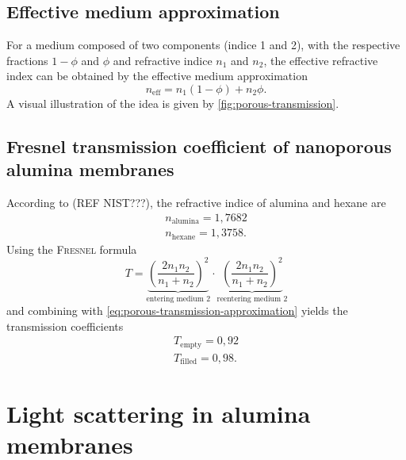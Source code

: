 \documentclass[../thesis.tex]{subfiles}
\begin{document}
      \subsection{Effective medium approximation}
      \label{subsec:effective-medium-approx}

        For a medium composed of two components (indice 1 and 2), with the respective fractions $1-\phi$ and $\phi$ and refractive indice $n_1$ and $n_2$, the effective refractive index can be obtained by the effective medium approximation
        \begin{equation}
          n_\mathrm{eff} = n_1 \left(1-\phi\right) + n_2 \phi.
          \label{eq:porous-transmission-approximation}
        \end{equation}
        A visual illustration of the idea is given by \cref{fig:porous-transmission}.

        


      \subsection{Fresnel transmission coefficient of nanoporous alumina membranes}

        According to (REF NIST???), the refractive indice of alumina and hexane are
        \begin{align*}
          n_\mathrm{alumina}=1,7682  \\%
          n_\mathrm{hexane}=1,3758  . %
        \end{align*}
        Using the \textsc{Fresnel} formula
        \begin{equation*}
          T=\underbrace{\left(\frac{2n_1n_2}{n_1+n_2}\right) ^2}_{\text{entering medium 2}}\cdot \underbrace{\left(\frac{2n_1n_2}{n_1+n_2}\right) ^2}_{\text{reentering medium 2}}
        \end{equation*}
        and combining with \cref{eq:porous-transmission-approximation} yields the transmission coefficients
        \begin{align}
          T_\mathrm{empty}=0,92 \\
          T_\mathrm{filled}=0,98  .
          \label{eq:trans-coeffs}
        \end{align}


      \section{Light scattering in alumina membranes}
      \label{sec:scattering-in-alumina-membranes}
\end{document}
